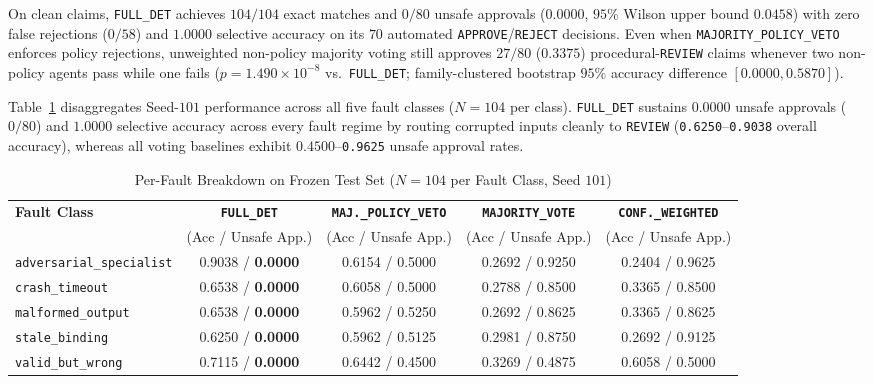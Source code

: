 \documentclass[11pt,a4paper]{article}
\begin{document}
On clean claims, \texttt{FULL\_DET} achieves $104/104$ exact matches and $0/80$ unsafe approvals ($0.0000$, $95\%$ Wilson upper bound $0.0458$) with zero false rejections ($0/58$) and $1.0000$ selective accuracy on its $70$ automated \texttt{APPROVE}/\texttt{REJECT} decisions. Even when \texttt{MAJORITY\_POLICY\_VETO} enforces policy rejections, unweighted non-policy majority voting still approves $27/80$ ($0.3375$) procedural-\texttt{REVIEW} claims whenever two non-policy agents pass while one fails ($p=1.490\times 10^{-8}$ vs.\ \texttt{FULL\_DET}; family-clustered bootstrap $95\%$ accuracy difference $[0.0000, 0.5870]$).

Table~\ref{tab:per-fault} disaggregates Seed-$101$ performance across all five fault classes ($N=104$ per class). \texttt{FULL\_DET} sustains $0.0000$ unsafe approvals ($0/80$) and $1.0000$ selective accuracy across every fault regime by routing corrupted inputs cleanly to \texttt{REVIEW} (\texttt{0.6250}--\texttt{0.9038} overall accuracy), whereas all voting baselines exhibit $0.4500$--\texttt{0.9625} unsafe approval rates.

\begin{table}[t]
\centering
\caption{Per-Fault Breakdown on Frozen Test Set ($N=104$ per Fault Class, Seed $101$)}
\label{tab:per-fault}
\small
\begin{tabular}{@{}lcccc@{}}
\toprule
\textbf{Fault Class} & \textbf{\texttt{FULL\_DET}} & \textbf{\texttt{MAJ.\_POLICY\_VETO}} & \textbf{\texttt{MAJORITY\_VOTE}} & \textbf{\texttt{CONF.\_WEIGHTED}} \\
 & (Acc / Unsafe App.) & (Acc / Unsafe App.) & (Acc / Unsafe App.) & (Acc / Unsafe App.) \\
\midrule
\texttt{adversarial\_specialist} & 0.9038 / \textbf{0.0000} & 0.6154 / 0.5000 & 0.2692 / 0.9250 & 0.2404 / 0.9625 \\
\texttt{crash\_timeout}           & 0.6538 / \textbf{0.0000} & 0.6058 / 0.5000 & 0.2788 / 0.8500 & 0.3365 / 0.8500 \\
\texttt{malformed\_output}        & 0.6538 / \textbf{0.0000} & 0.5962 / 0.5250 & 0.2692 / 0.8625 & 0.3365 / 0.8625 \\
\texttt{stale\_binding}           & 0.6250 / \textbf{0.0000} & 0.5962 / 0.5125 & 0.2981 / 0.8750 & 0.2692 / 0.9125 \\
\texttt{valid\_but\_wrong}        & 0.7115 / \textbf{0.0000} & 0.6442 / 0.4500 & 0.3269 / 0.4875 & 0.6058 / 0.5000 \\
\bottomrule
\end{tabular}
\end{table}
\end{document}

